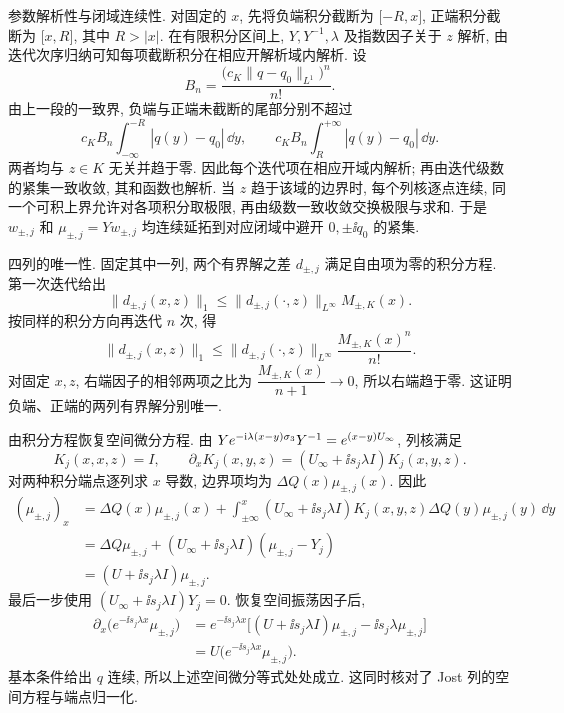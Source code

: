 \par\medskip\noindent 参数解析性与闭域连续性.\quad
对固定的 $x$, 先将负端积分截断为 $\lbrack-R,x\rbrack$,
正端积分截断为 $\lbrack x,R\rbrack$, 其中 $R>|x|$.
在有限积分区间上, $Y,Y^{-1},\lambda$ 及指数因子关于 $z$ 解析,
由迭代次序归纳可知每项截断积分在相应开解析域内解析.
设
\begin{equation*}
B_n=\dfrac{\bigl(c_K\|q-q_0\|_{L^1}\bigr)^n}{n!}.
\end{equation*}
由上一段的一致界, 负端与正端未截断的尾部分别不超过
\begin{equation*}
c_KB_n\int_{-\infty}^{-R}|q(y)-q_0|\,\dd y,
\qquad
c_KB_n\int_R^{+\infty}|q(y)-q_0|\,\dd y.
\end{equation*}
两者均与 $z\in K$ 无关并趋于零. 因此每个迭代项在相应开域内解析;
再由迭代级数的紧集一致收敛, 其和函数也解析.
当 $z$ 趋于该域的边界时, 每个列核逐点连续,
同一个可积上界允许对各项积分取极限, 再由级数一致收敛交换极限与求和.
于是 $w_{\pm,j}$ 和 $\mu_{\pm,j}=Yw_{\pm,j}$
均连续延拓到对应闭域中避开 $0,\pm\ii q_0$ 的紧集.

\par\medskip\noindent 四列的唯一性.\quad
固定其中一列, 两个有界解之差 $d_{\pm,j}$ 满足自由项为零的积分方程.
第一次迭代给出
\begin{equation*}
\|d_{\pm,j}(x,z)\|_1
\le\|d_{\pm,j}(\cdot,z)\|_{L^\infty}M_{\pm,K}(x).
\end{equation*}
按同样的积分方向再迭代 $n$ 次, 得
\begin{equation*}
\|d_{\pm,j}(x,z)\|_1
\le\|d_{\pm,j}(\cdot,z)\|_{L^\infty}
\dfrac{M_{\pm,K}(x)^n}{n!}.
\end{equation*}
对固定 $x,z$, 右端因子的相邻两项之比为
$\dfrac{M_{\pm,K}(x)}{n+1}\to0$, 所以右端趋于零.
这证明负端、正端的两列有界解分别唯一.

\par\medskip\noindent 由积分方程恢复空间微分方程.\quad
由 $Ye^{-\mathrm{i}\lambda(x-y)\sigma_3}Y^{-1}=e^{(x-y)U_\infty}$,
列核满足
\begin{equation*}
K_j(x,x,z)=I,\qquad
\partial_xK_j(x,y,z)
=(U_\infty+\ii s_j\lambda I)K_j(x,y,z).
\end{equation*}
对两种积分端点逐列求 $x$ 导数, 边界项均为
$\Delta Q(x)\mu_{\pm,j}(x)$. 因此
\begin{align*}
(\mu_{\pm,j})_x
&=\Delta Q(x)\mu_{\pm,j}(x)
+\int_{\pm\infty}^{x}
(U_\infty+\ii s_j\lambda I)
K_j(x,y,z)\Delta Q(y)\mu_{\pm,j}(y)\,\dd y\\
&=\Delta Q\mu_{\pm,j}
+(U_\infty+\ii s_j\lambda I)(\mu_{\pm,j}-Y_j)\\
&=(U+\ii s_j\lambda I)\mu_{\pm,j}.
\end{align*}
最后一步使用 $(U_\infty+\ii s_j\lambda I)Y_j=0$.
恢复空间振荡因子后,
\begin{align*}
\partial_x\bigl(e^{-\ii s_j\lambda x}\mu_{\pm,j}\bigr)
&=e^{-\ii s_j\lambda x}
\bigl[(U+\ii s_j\lambda I)\mu_{\pm,j}
-\ii s_j\lambda\mu_{\pm,j}\bigr]\\
&=U\bigl(e^{-\ii s_j\lambda x}\mu_{\pm,j}\bigr).
\end{align*}
基本条件给出 $q$ 连续, 所以上述空间微分等式处处成立.
这同时核对了 Jost 列的空间方程与端点归一化.

